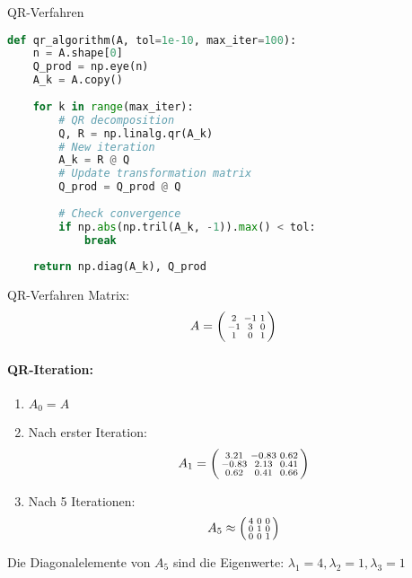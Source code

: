 \begin{examplecode}{QR-Verfahren}
\begin{lstlisting}[language=Python, style=basesmol]
def qr_algorithm(A, tol=1e-10, max_iter=100):
    n = A.shape[0]
    Q_prod = np.eye(n)
    A_k = A.copy()
    
    for k in range(max_iter):
        # QR decomposition
        Q, R = np.linalg.qr(A_k)
        # New iteration
        A_k = R @ Q
        # Update transformation matrix
        Q_prod = Q_prod @ Q
        
        # Check convergence
        if np.abs(np.tril(A_k, -1)).max() < tol:
            break
            
    return np.diag(A_k), Q_prod
\end{lstlisting}
\end{examplecode}

\begin{example2}{QR-Verfahren}
Matrix:
$$A = \begin{psmallmatrix}
2 & -1 & 1\\
-1 & 3 & 0\\
1 & 0 & 1
\end{psmallmatrix}$$

\paragraph{QR-Iteration:}
\begin{enumerate}
    \item $A_0 = A$
    \item Nach erster Iteration:
    $$A_1 = \begin{psmallmatrix}
    3.21 & -0.83 & 0.62\\
    -0.83 & 2.13 & 0.41\\
    0.62 & 0.41 & 0.66
    \end{psmallmatrix}$$
    \item Nach 5 Iterationen:
    $$A_5 \approx \begin{psmallmatrix}
    4 & 0 & 0\\
    0 & 1 & 0\\
    0 & 0 & 1
    \end{psmallmatrix}$$
\end{enumerate}

Die Diagonalelemente von $A_5$ sind die Eigenwerte: $\lambda_1 = 4, \lambda_2 = 1, \lambda_3 = 1$
\end{example2}

